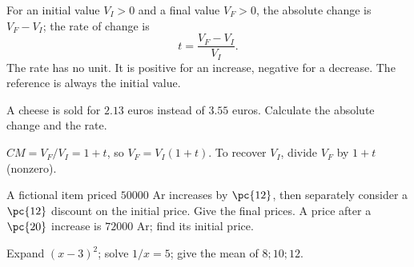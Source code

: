 \begin{keypoint}[Definition]
For an initial value $V_I>0$ and a final value $V_F>0$, the absolute change is $V_F-V_I$; the rate of change is
\[t=\frac{V_F-V_I}{V_I}.\]
The rate has no unit. It is positive for an increase, negative for a decrease. The reference is always the initial value.
\end{keypoint}
\begin{example}A cheese is sold for $\num{2,13}$ euros instead of $\num{3,55}$ euros. Calculate the absolute change and the rate.\end{example}
\begin{keypoint}[Multiplier]
$CM=V_F/V_I=1+t$, so $V_F=V_I(1+t)$. To recover $V_I$, divide $V_F$ by $1+t$ (nonzero).
\end{keypoint}
\begin{example}A fictional item priced $50000$ Ar increases by $\pc{12}$, then separately consider a $\pc{12}$ discount on the initial price. Give the final prices. A price after a $\pc{20}$ increase is $72000$ Ar; find its initial price.\end{example}
\begin{fluency}[5--10 min]Expand $(x-3)^2$; solve $1/x=5$; give the mean of $8;10;12$.\end{fluency}

